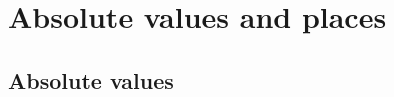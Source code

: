 \def\module{Algebraic Number Theory}
\def\lecturer{Prof Tony Scholl}
\def\term{Lent 2021}
\def\cover{}
\def\syllabus{}
\def\thm{section}



\newcommand{\1}{\mathbbm{1}}
\newcommand{\dA}{\dif_\AA}
\newcommand{\dF}{\dif_F}
\newcommand{\dJ}{\dif_\JJ}
\newcommand{\dJI}{\dif_{\JJ^1}}
\newcommand{\dv}{\dif_v}
\newcommand{\hathat}[1]{\widehat{\widehat{#1\ }}\!\!}
\newcommand{\intA}[3][]{\int_{\ifstrempty{#1}{\AA_K}{#1}} #2 \, \dA #3}
\newcommand{\intF}[3][]{\int_{\ifstrempty{#1}{F}{#1}} #2 \, \dF #3}
\newcommand{\intFX}[3][]{\int_{\ifstrempty{#1}{F^\times}{#1}} #2 \, \dF^\times #3}
\newcommand{\intJ}[3][]{\int_{\ifstrempty{#1}{\JJ_K}{#1}} #2 \, \dJ #3}
\newcommand{\intJI}[3][]{\int_{\ifstrempty{#1}{\JJ_K^1}{#1}} #2 \, \dJI #3}
\newcommand{\intv}[3][]{\int_{\ifstrempty{#1}{K_v}{#1}} #2 \, \dv #3}
\newcommand{\intvX}[3][]{\int_{\ifstrempty{#1}{K_v^\times}{#1}} #2 \, \dv^\times #3}
\newcommand{\mods}{\mod\!\!^*\ }
\newcommand{\twobytwosmall}[4]{
  \begin{psmallmatrix}
    #1 & #2 \\
    #3 & #4
  \end{psmallmatrix}
}





\setcounter{section}{0}

\section{Absolute values and places}

\subsection{Absolute values}


